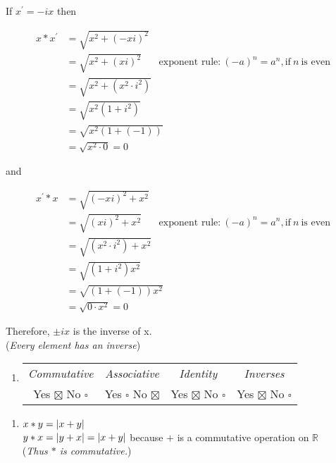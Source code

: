 \documentclass[12pt]{article}
\DeclarePairedDelimiter{\abs}{\lvert}{\rvert}
\begin{document}
\begin{flushleft}
\begin{enumerate}
If $x^{'} = -ix$ then 

\begin{align*}
x * x^{'} &= \sqrt{x^2 + (-xi)^2} \\
&= \sqrt{x^2 + (xi)^2} ~~~~~~~~  \text{exponent rule:}~(-a)^n = a^n, \text{if} ~n ~\text{is even}\\
&= \sqrt{x^2 + (x^2 \cdot i^2)} \\
&= \sqrt{x^2(1+i^2)} \\
&= \sqrt{x^2(1+(-1))} \\
&= \sqrt{x^2 \cdot 0} = 0
\end{align*}

and

\begin{align*}
x^{'} * x &= \sqrt{(-xi)^2 + x^2} \\
&= \sqrt{(xi)^2 + x^2}  ~~~~~~~~  \text{exponent rule:}~(-a)^n = a^n, \text{if} ~n ~\text{is even}\\
&= \sqrt{(x^2 \cdot i^2) + x^2} \\
&= \sqrt{(1+i^2)x^2} \\
&= \sqrt{(1+(-1))x^2} \\
&= \sqrt{0 \cdot x^2 } = 0
\end{align*}

Therefore, $\pm ix$ is the inverse of x. \\
(\textit{Every element has an inverse})

\end{enumerate}

\renewcommand{\theenumi}{\arabic{enumi}}
\begin{enumerate}\addtocounter{enumi}{1}

\item 
\begin{tabular}{c c c c}
\textit{Commutative} & \textit{Associative} & \textit{Identity} & \textit{Inverses} \\
Yes $\boxtimes$ No $\square$ & Yes $\square$ No $\boxtimes$ & Yes $\boxtimes$ No $\square$ & Yes $\boxtimes$ No $\square$ \\
\end{tabular}
\end{enumerate}

\renewcommand{\theenumi}{(\roman{enumi})}
\begin{enumerate} 
\item $x * y = \abs{x + y}$ \\
$y * x = \abs{y + x} = \abs{x + y}$  because $+$ is a commutative operation on $\mathbb{R}$ \\
(\textit{Thus $*$ is commutative.})


\end{enumerate}
\end{flushleft}
\end{document}
